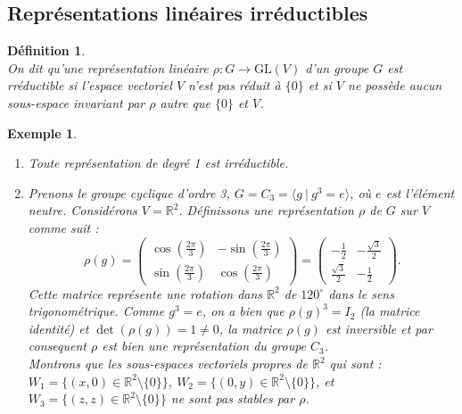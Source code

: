 \documentclass[a4paper, 14pt]{report}
\newtheorem{definition}{Définition}[section]
\newtheorem{example}{Exemple}[section]
\begin{document}
\begin{onehalfspace}
{			
			\section{Représentations linéaires irréductibles}
			\begin{definition}  \cite{serre1971representation} \\
On dit qu'une représentation linéaire \( \rho : G \rightarrow \mathrm{GL}(V) \) d'un groupe \(G\) est rréductible si l'espace vectoriel \( V \) n'est pas réduit à \( \{0\} \) et si \( V \) ne possède aucun sous-espace invariant par \( \rho \) autre que \( \{0\} \) et \( V \).	
			\end{definition}
			
			\begin{example} 
				\begin{enumerate} \
					\item Toute représentation de degré 1 est irréductible.
					\item Prenons le groupe cyclique d'ordre 3, \( G = C_3 = \langle g \ | \ g^3 = e \rangle \), où \( e \) est l'élément neutre.
					Considérons \( V = \mathbb{R}^2 \). Définissons une représentation \( \rho \) de \( G \) sur \( V \) comme suit :
					\[
					\rho(g) =
					\begin{pmatrix}
						\cos\left(\frac{2\pi}{3}\right) & -\sin\left(\frac{2\pi}{3}\right) \\
						\sin\left(\frac{2\pi}{3}\right) & \cos\left(\frac{2\pi}{3}\right)
					\end{pmatrix}
					=
					\begin{pmatrix}
						-\frac{1}{2} & -\frac{\sqrt{3}}{2} \\
						\frac{\sqrt{3}}{2} & -\frac{1}{2}
					\end{pmatrix}.
					\]
					Cette matrice représente une rotation dans \( \mathbb{R}^2 \) de \( 120^\circ \) dans le sens trigonométrique. Comme \( g^3 = e \), on a bien que \( \rho(g)^3 = I_2 \) (la matrice identité) et \(\det(\rho(g))=1 \neq 0\), la matrice \(\rho(g)\) est inversible et par consequent \( \rho \) est bien une représentation du groupe \( C_3 \).\\
					Montrons que les sous-espaces vectoriels propres de \( \mathbb{R}^2 \) qui sont : 
					\( W_1 = \{ (x, 0) \in \mathbb{R}^2 \setminus \{0\} \} \), 
					\( W_2 = \{ (0, y) \in \mathbb{R}^2 \setminus \{0\} \} \), 
					et 
					\( W_3 = \{ (z, z) \in \mathbb{R}^2 \setminus \{0\} \} \) 
					ne sont pas stables par \( \rho \).\\

\end{enumerate}
\end{example}}
\end{onehalfspace}
\end{document}
